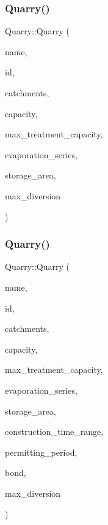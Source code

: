 \mbox{\label{classQuarry_a28c4db26230c2ff3f82c8c0f70f2f124_a28c4db26230c2ff3f82c8c0f70f2f124}} 
\subsubsection{\texorpdfstring{Quarry()}{Quarry()}\hspace{0.1cm}{\footnotesize\ttfamily [3/5]}}
{\footnotesize\ttfamily Quarry\+::\+Quarry (\begin{DoxyParamCaption}\item[{const char $\ast$}]{name,  }\item[{const int}]{id,  }\item[{const vector$<$ \mbox{\hyperlink{classCatchment}{Catchment}} $\ast$$>$ \&}]{catchments,  }\item[{const double}]{capacity,  }\item[{const double}]{max\+\_\+treatment\+\_\+capacity,  }\item[{\mbox{\hyperlink{classEvaporationSeries}{Evaporation\+Series}} \&}]{evaporation\+\_\+series,  }\item[{double}]{storage\+\_\+area,  }\item[{double}]{max\+\_\+diversion }\end{DoxyParamCaption})}

\mbox{\label{classQuarry_a561616791620a55709bfca645bc8cbad_a561616791620a55709bfca645bc8cbad}} 
\subsubsection{\texorpdfstring{Quarry()}{Quarry()}\hspace{0.1cm}{\footnotesize\ttfamily [4/5]}}
{\footnotesize\ttfamily Quarry\+::\+Quarry (\begin{DoxyParamCaption}\item[{const char $\ast$}]{name,  }\item[{const int}]{id,  }\item[{const vector$<$ \mbox{\hyperlink{classCatchment}{Catchment}} $\ast$$>$ \&}]{catchments,  }\item[{const double}]{capacity,  }\item[{const double}]{max\+\_\+treatment\+\_\+capacity,  }\item[{\mbox{\hyperlink{classEvaporationSeries}{Evaporation\+Series}} \&}]{evaporation\+\_\+series,  }\item[{double}]{storage\+\_\+area,  }\item[{const vector$<$ double $>$ \&}]{construction\+\_\+time\+\_\+range,  }\item[{double}]{permitting\+\_\+period,  }\item[{\mbox{\hyperlink{classBond}{Bond}} \&}]{bond,  }\item[{double}]{max\+\_\+diversion }\end{DoxyParamCaption})}

